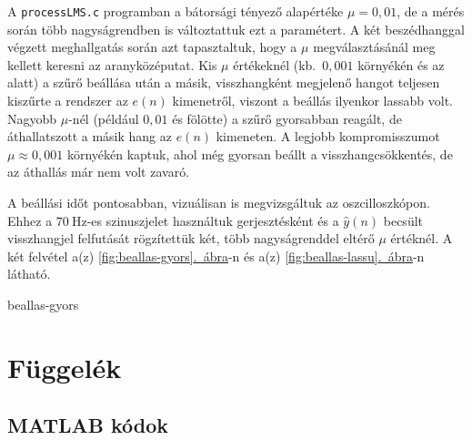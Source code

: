 \documentclass[12pt,a4paper]{article}
\newcommand{\abrara}[1]{\hyperref[#1]{\ref*{#1}.~ábra}}
\begin{document}
A \texttt{processLMS.c} programban a bátorsági tényező alapértéke $\mu = 0{,}01$, de a mérés során több nagyságrendben is változtattuk ezt a paramétert. A két beszédhanggal végzett meghallgatás során azt tapasztaltuk, hogy a $\mu$ megválasztásánál meg kellett keresni az aranyközéputat. Kis $\mu$ értékeknél (kb.~$0{,}001$ környékén és az alatt) a szűrő beállása után a másik, visszhangként megjelenő hangot teljesen kiszűrte a rendszer az $e(n)$ kimenetről, viszont a beállás ilyenkor lassabb volt. Nagyobb $\mu$-nél (például $0{,}01$ és fölötte) a szűrő gyorsabban reagált, de áthallatszott a másik hang az $e(n)$ kimeneten. A legjobb kompromisszumot $\mu \approx 0{,}001$ környékén kaptuk, ahol még gyorsan beállt a visszhangcsökkentés, de az áthallás már nem volt zavaró.\par\medskip

A beállási időt pontosabban, vizuálisan is megvizsgáltuk az oszcilloszkópon. Ehhez a $70~\mathrm{Hz}$-es szinuszjelet használtuk gerjesztésként és a $\hat{y}(n)$ becsült visszhangjel felfutását rögzítettük két, több nagyságrenddel eltérő $\mu$ értéknél. A két felvétel a(z) \abrara{fig:beallas-gyors}-n és a(z) \abrara{fig:beallas-lassu}-n látható.

 {beallas-gyors}


\newpage
\section*{Függelék}
\subsection*{MATLAB kódok}

{\singlespacing




\newpage




\newpage

}
\end{document}
